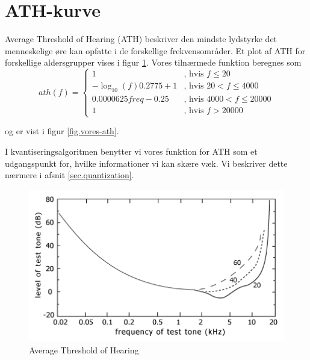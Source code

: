 \section{ATH-kurve}
Average Threshold of Hearing (ATH) beskriver den mindste lydstyrke det
menneskelige øre kan opfatte i de forskellige frekvensområder. Et plot
af ATH for forskellige aldersgrupper vises i figur
\ref{fig.ath}. Vores tilnærmede funktion beregnes som
\begin{equation}
ath(f) = \left\{
\begin{array}{ll}
1                         & \textrm{, hvis } f \leq 20\\
-\log_{10}(f) 0.2775 + 1& \textrm{, hvis } 20 < f \leq 4000\\
0.0000625 freq - 0.25   & \textrm{, hvis } 4000 < f \leq 20000\\
1                         & \textrm{, hvis } f > 20000
\end{array} \right.
\end{equation}

og er vist i figur \ref{fig.vores-ath}.

I kvantiseringsalgoritmen benytter vi vores funktion for ATH som et udgangspunkt for, hvilke informationer vi kan skære væk. Vi beskriver dette nærmere i afsnit \ref{sec.quantization}.

\begin{figure}[h!]
\begin{center}
\includegraphics[width=12cm]{ATH}
\end{center}
\caption{Average Threshold of Hearing}
\label{fig.ath}
\end{figure}

